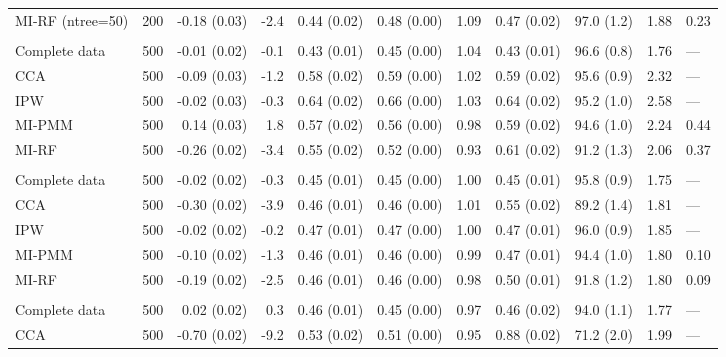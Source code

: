 \begin{longtable}{l|rrrrrrrrrl}
\midrule\addlinespace[2.5pt]
\multicolumn{11}{l}{Wasting — MAR 30\% (ntree=50)} \\[2.5pt] 
\midrule\addlinespace[2.5pt]
MI-RF (ntree=50) & 200 & -0.18 (0.03) & -2.4 & 0.44 (0.02) & 0.48 (0.00) & 1.09 & 0.47 (0.02) & 97.0 (1.2) & 1.88 & 0.23 \\ 
\midrule\addlinespace[2.5pt]
\multicolumn{11}{l}{Wasting — MAR 50\%} \\[2.5pt] 
\midrule\addlinespace[2.5pt]
Complete data & 500 & -0.01 (0.02) & -0.1 & 0.43 (0.01) & 0.45 (0.00) & 1.04 & 0.43 (0.01) & 96.6 (0.8) & 1.76 & — \\ 
CCA & 500 & -0.09 (0.03) & -1.2 & 0.58 (0.02) & 0.59 (0.00) & 1.02 & 0.59 (0.02) & 95.6 (0.9) & 2.32 & — \\ 
IPW & 500 & -0.02 (0.03) & -0.3 & 0.64 (0.02) & 0.66 (0.00) & 1.03 & 0.64 (0.02) & 95.2 (1.0) & 2.58 & — \\ 
MI-PMM & 500 & 0.14 (0.03) & 1.8 & 0.57 (0.02) & 0.56 (0.00) & 0.98 & 0.59 (0.02) & 94.6 (1.0) & 2.24 & 0.44 \\ 
MI-RF & 500 & -0.26 (0.02) & -3.4 & 0.55 (0.02) & 0.52 (0.00) & 0.93 & 0.61 (0.02) & 91.2 (1.3) & 2.06 & 0.37 \\ 
\midrule\addlinespace[2.5pt]
\multicolumn{11}{l}{Wasting — MAR-strong 10\%} \\[2.5pt] 
\midrule\addlinespace[2.5pt]
Complete data & 500 & -0.02 (0.02) & -0.3 & 0.45 (0.01) & 0.45 (0.00) & 1.00 & 0.45 (0.01) & 95.8 (0.9) & 1.75 & — \\ 
CCA & 500 & -0.30 (0.02) & -3.9 & 0.46 (0.01) & 0.46 (0.00) & 1.01 & 0.55 (0.02) & 89.2 (1.4) & 1.81 & — \\ 
IPW & 500 & -0.02 (0.02) & -0.2 & 0.47 (0.01) & 0.47 (0.00) & 1.00 & 0.47 (0.01) & 96.0 (0.9) & 1.85 & — \\ 
MI-PMM & 500 & -0.10 (0.02) & -1.3 & 0.46 (0.01) & 0.46 (0.00) & 0.99 & 0.47 (0.01) & 94.4 (1.0) & 1.80 & 0.10 \\ 
MI-RF & 500 & -0.19 (0.02) & -2.5 & 0.46 (0.01) & 0.46 (0.00) & 0.98 & 0.50 (0.01) & 91.8 (1.2) & 1.80 & 0.09 \\ 
\midrule\addlinespace[2.5pt]
\multicolumn{11}{l}{Wasting — MAR-strong 30\%} \\[2.5pt] 
\midrule\addlinespace[2.5pt]
Complete data & 500 & 0.02 (0.02) & 0.3 & 0.46 (0.01) & 0.45 (0.00) & 0.97 & 0.46 (0.02) & 94.0 (1.1) & 1.77 & — \\ 
CCA & 500 & -0.70 (0.02) & -9.2 & 0.53 (0.02) & 0.51 (0.00) & 0.95 & 0.88 (0.02) & 71.2 (2.0) & 1.99 & — \\ 

\end{longtable}
